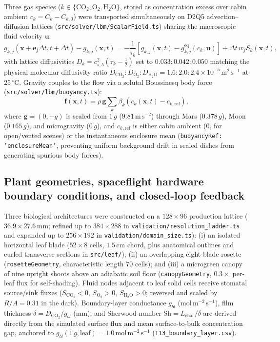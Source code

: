 \documentclass[preprint,11pt,numbers,sort&compress]{elsarticle}
\newcommand{\mseu}{\ensuremath{\mathrm{m^{2}\,s^{-1}}}}
\newcommand{\molms}{\ensuremath{\mathrm{mol\,m^{-2}\,s^{-1}}}}
\newcommand{\msq}{\ensuremath{\mathrm{m\,s^{-2}}}}
\begin{document}
Three gas species ($k \in \{\mathrm{CO_2}, \mathrm{O_2}, \mathrm{H_2O}\}$, stored as concentration excess over cabin ambient $c_k = C_k - C_{k,0}$) were transported simultaneously on D2Q5 advection--diffusion lattices (\texttt{src/solver/lbm/ScalarField.ts}) sharing the macroscopic fluid velocity $\mathbf{u}$:
\begin{equation}
g_{k,j}(\mathbf{x}+\mathbf{e}_j\Delta t, t+\Delta t) - g_{k,j}(\mathbf{x},t) = -\frac{1}{\tau_k}\left[g_{k,j}(\mathbf{x},t) - g_{k,j}^{\mathrm{eq}}(c_k,\mathbf{u})\right] + \Delta t\,w_j S_k(\mathbf{x},t),
\label{eq:lbm_d2q5}
\end{equation}
with lattice diffusivities $D_k = c_{s,5}^2(\tau_k - \tfrac{1}{2})$ set to $0.033 : 0.042 : 0.050$ matching the physical molecular diffusivity ratio $D_{\mathrm{CO_2}} : D_{\mathrm{O_2}} : D_{\mathrm{H_2O}} = 1.6 : 2.0 : 2.4 \times 10^{-5}\,\mseu$ at $25\,^\circ\mathrm{C}$. Gravity couples to the flow via a solutal Boussinesq body force (\texttt{src/solver/lbm/buoyancy.ts}):
\begin{equation}
\mathbf{f}(\mathbf{x},t) = \rho\,\mathbf{g}\sum_k \beta_k\left(c_k(\mathbf{x},t) - c_{k,\mathrm{ref}}\right),
\label{eq:boussinesq}
\end{equation}
where $\mathbf{g} = (0, -g)$ is scaled from $1\,g$ ($9.81\,\msq$) through Mars ($0.378\,g$), Moon ($0.165\,g$), and microgravity ($0\,g$), and $c_{k,\mathrm{ref}}$ is either cabin ambient ($0$, for open/vented scenes) or the instantaneous enclosure mean (\texttt{buoyancyRef: 'enclosureMean'}, preventing uniform background drift in sealed dishes from generating spurious body forces).

\subsection{Plant geometries, spaceflight hardware boundary conditions, and closed-loop feedback}

Three biological architectures were constructed on a $128\times 96$ production lattice ($36.9\times 27.6\,\mathrm{mm}$; refined up to $384\times 288$ in \texttt{validation/resolution\_ladder.ts} and expanded up to $256\times 192$ in \texttt{validation/domain\_size.ts}): (i) an isolated horizontal leaf blade ($52\times 8$ cells, $1.5\,\mathrm{cm}$ chord, plus anatomical outlines and curled transverse sections in \texttt{src/leaf/}); (ii) an overlapping eight-blade rosette (\texttt{rosetteGeometry}, characteristic length $70$ cells); and (iii) a microgreen canopy of nine upright shoots above an adiabatic soil floor (\texttt{canopyGeometry}, $0.3\times$ per-leaf flux for self-shading). Fluid nodes adjacent to leaf solid cells receive stomatal source/sink fluxes ($S_{\mathrm{CO_2}} < 0$, $S_{\mathrm{O_2}} > 0$, $S_{\mathrm{H_2O}} > 0$; reversed and scaled by $R/A = 0.31$ in the dark). Boundary-layer conductance $g_{bl}$ ($\molms$), film thickness $\delta = D_{\mathrm{CO_2}}/g_{bl}$ ($\mathrm{mm}$), and Sherwood number $\mathrm{Sh} = L_{\text{char}}/\delta$ are derived directly from the simulated surface flux and mean surface-to-bulk concentration gap, anchored to $g_{bl}(1\,g,\text{leaf}) = 1.0\,\molms$ (\texttt{T13\_boundary\_layer.csv}).
\end{document}

